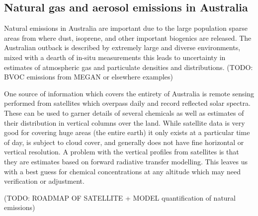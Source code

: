\subsection{Natural gas and aerosol emissions in Australia}
Natural emissions in Australia are important due to the large population sparse areas from where dust, isoprene, and other important biogenics are released.
The Australian outback is described by extremely large and diverse environments, mixed with a dearth of in-situ measurements this leads to uncertainty in estimates of atmospheric gas and particulate densities and distributions.
(TODO: BVOC emissions from MEGAN or elsewhere examples)

One source of information which covers the entirety of Australia is remote sensing performed from satellites which overpass daily and record reflected solar spectra.
These can be used to garner details of several chemicals as well as estimates of their distribution in vertical columns over the land.
While satellite data is very good for covering huge areas (the entire earth) it only exists at a particular time of day, is subject to cloud cover, and generally does not have fine horizontal or vertical resolution.
A problem with the vertical profiles from satellites is that they are estimates based on forward radiative transfer modelling.
This leaves us with a best guess for chemical concentrations at any altitude which may need verification or adjustment.


(TODO: ROADMAP OF SATELLITE + MODEL quantification of natural emissions)



  
  
  